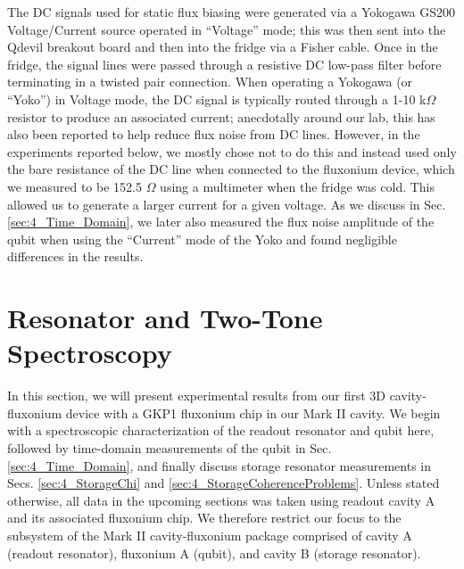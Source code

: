 The DC signals used for static flux biasing were generated via a Yokogawa GS200 Voltage/Current source operated in ``Voltage'' mode; this was then sent into the Qdevil breakout board and then into the fridge via a Fisher cable. Once in the fridge, the signal lines were passed through a resistive DC low-pass filter before terminating in a twisted pair connection. When operating a Yokogawa (or ``Yoko'') in Voltage mode, the DC signal is typically routed through a 1-10 k$\Omega$ resistor to produce an associated current; anecdotally around our lab, this has also been reported to help reduce flux noise from DC lines. However, in the experiments reported below, we mostly chose not to do this and instead used only the bare resistance of the DC line when connected to the fluxonium device, which we measured to be 152.5 $\Omega$ using a multimeter when the fridge was cold. This allowed us to generate a larger current for a given voltage. As we discuss in Sec. \ref{sec:4_Time_Domain}, we later also measured the flux noise amplitude of the qubit when using the ``Current'' mode of the Yoko and found negligible differences in the results. %



\clearpage
\section{Resonator and Two-Tone Spectroscopy\label{sec:4_Resonator_and_Two_Tone}}

In this section, we will present experimental results from our first 3D cavity-fluxonium device with a GKP1 fluxonium chip in our Mark II cavity. We begin with a spectroscopic characterization of the readout resonator and qubit here, followed by time-domain measurements of the qubit in Sec. \ref{sec:4_Time_Domain}, and finally discuss storage resonator measurements in Secs. \ref{sec:4_StorageChi} and \ref{sec:4_StorageCoherenceProblems}. Unless stated otherwise, all data in the upcoming sections was taken using readout cavity A and its associated fluxonium chip. We therefore restrict our focus to the subsystem of the Mark II cavity-fluxonium package comprised of cavity A (readout resonator), fluxonium A (qubit), and cavity B (storage resonator).

